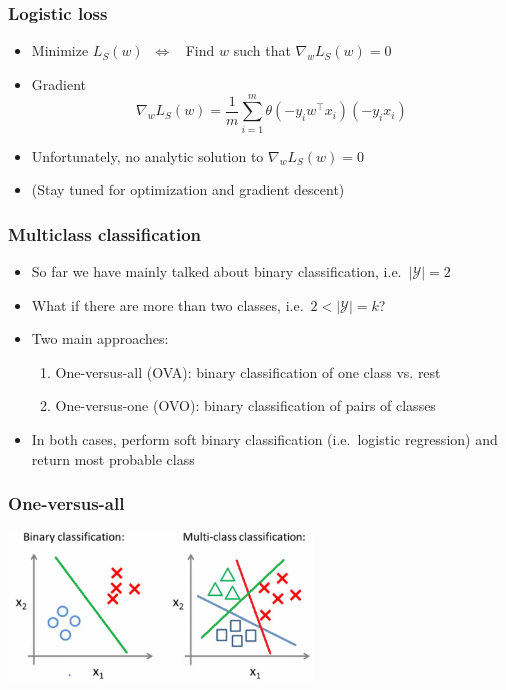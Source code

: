 \documentclass[10pt]{beamer}
\begin{document}
\begin{frame}
  \frametitle{Logistic loss}
  \begin{itemize}
	\item Minimize $L_S(w) \;\; \Leftrightarrow \;\;$ Find $w$ such that $\nabla_w L_S(w) = 0$
	\item {\color{blue} Gradient}
	\[\nabla_w L_S(w) = \frac 1 m \sum_{i=1}^m \theta(-y_i w^\top x_i)(-y_ix_i)\]
	\item Unfortunately, no analytic solution to $\nabla_w L_S(w) = 0$
	\pause
	\item (Stay tuned for {\color{red} optimization and gradient descent})
  \end{itemize}
\end{frame}

\begin{frame}
  \frametitle{Multiclass classification}
  \begin{itemize}
	\item So far we have mainly talked about binary classification, i.e.~$|\mathcal{Y}|=2$
	\item What if there are more than two classes, i.e.~$2<|\mathcal{Y}|=k$?
	\item Two main approaches:
	\begin{enumerate}
	\item {\color{red} One-versus-all (OVA)}: {\color{blue} binary} classification of one class vs. rest
	\item {\color{red} One-versus-one (OVO)}: {\color{blue} binary} classification of pairs of classes
	\end{enumerate}
	\item In both cases, perform soft binary classification (i.e.~logistic regression) and return {\color{green} most probable class}
  \end{itemize}
\end{frame}

\begin{frame}
  \frametitle{One-versus-all}
  \begin{center}
  \includegraphics[height=4cm]{images/multiclass.png}
  \end{center}
\end{frame}
\end{document}
